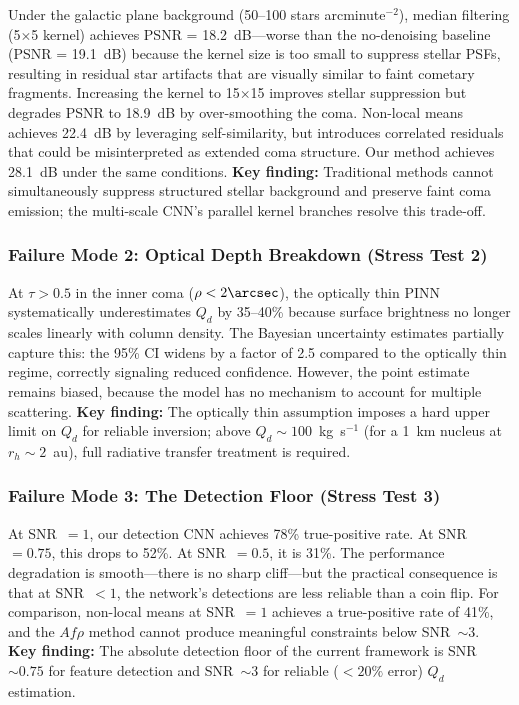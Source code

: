 \documentclass[preprint2]{aastex631}
\begin{document}
Under the galactic plane background (50--100 stars arcminute$^{-2}$), median filtering (5$\times$5 kernel) achieves PSNR = 18.2~dB---worse than the no-denoising baseline (PSNR = 19.1~dB) because the kernel size is too small to suppress stellar PSFs, resulting in residual star artifacts that are visually similar to faint cometary fragments. Increasing the kernel to 15$\times$15 improves stellar suppression but degrades PSNR to 18.9~dB by over-smoothing the coma. Non-local means achieves 22.4~dB by leveraging self-similarity, but introduces correlated residuals that could be misinterpreted as extended coma structure. Our method achieves 28.1~dB under the same conditions. \textbf{Key finding:} Traditional methods cannot simultaneously suppress structured stellar background and preserve faint coma emission; the multi-scale CNN's parallel kernel branches resolve this trade-off.

\subsubsection{Failure Mode 2: Optical Depth Breakdown (Stress Test 2)}

At $\tau > 0.5$ in the inner coma ($\rho < 2\arcsec$), the optically thin PINN systematically underestimates $Q_d$ by 35--40\% because surface brightness no longer scales linearly with column density. The Bayesian uncertainty estimates partially capture this: the 95\% CI widens by a factor of 2.5 compared to the optically thin regime, correctly signaling reduced confidence. However, the point estimate remains biased, because the model has no mechanism to account for multiple scattering. \textbf{Key finding:} The optically thin assumption imposes a hard upper limit on $Q_d$ for reliable inversion; above $Q_d \sim 100$~kg~s$^{-1}$ (for a 1~km nucleus at $r_h \sim 2$~au), full radiative transfer treatment is required.

\subsubsection{Failure Mode 3: The Detection Floor (Stress Test 3)}

At SNR~$=1$, our detection CNN achieves 78\% true-positive rate. At SNR~$=0.75$, this drops to 52\%. At SNR~$=0.5$, it is 31\%. The performance degradation is smooth---there is no sharp cliff---but the practical consequence is that at SNR~$<1$, the network's detections are less reliable than a coin flip. For comparison, non-local means at SNR~$=1$ achieves a true-positive rate of 41\%, and the $Af\rho$ method cannot produce meaningful constraints below SNR~$\sim 3$. \textbf{Key finding:} The absolute detection floor of the current framework is SNR~$\sim 0.75$ for feature detection and SNR~$\sim 3$ for reliable ($<20\%$ error) $Q_d$ estimation.
\end{document}
